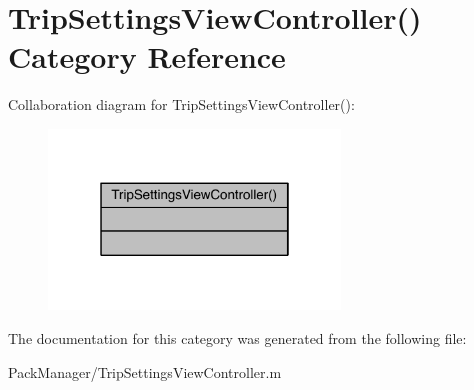 \hypertarget{category_trip_settings_view_controller_07_08}{\section{Trip\-Settings\-View\-Controller() Category Reference}
\label{category_trip_settings_view_controller_07_08}
}


Collaboration diagram for Trip\-Settings\-View\-Controller()\-:\nopagebreak
\begin{figure}[H]
\begin{center}
\leavevmode
\includegraphics[width=220pt]{category_trip_settings_view_controller_07_08__coll__graph}
\end{center}
\end{figure}


The documentation for this category was generated from the following file\-:\begin{DoxyCompactItemize}
\item 
Pack\-Manager/Trip\-Settings\-View\-Controller.\-m\end{DoxyCompactItemize}
